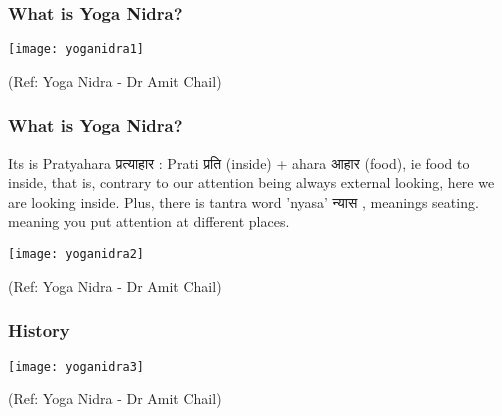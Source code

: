 \begin{frame}[fragile]\frametitle{What is Yoga Nidra?}
      \begin{center}
        \texttt{[image: yoganidra1]}

		{\tiny (Ref: Yoga Nidra - Dr Amit Chail)}		
        \end{center}

\end{frame}

\begin{frame}[fragile]\frametitle{What is Yoga Nidra?}
Its is Pratyahara प्रत्याहार  : Prati प्रति (inside) + ahara आहार  (food), ie food to inside, that is, contrary to our attention being always external looking, here we are looking inside. Plus, there is tantra word 'nyasa' न्यास , meanings seating. meaning you put attention at different places.

      \begin{center}
        \texttt{[image: yoganidra2]}

		{\tiny (Ref: Yoga Nidra - Dr Amit Chail)}		
        \end{center}

\end{frame}

\begin{frame}[fragile]\frametitle{History}
      \begin{center}
        \texttt{[image: yoganidra3]}

		{\tiny (Ref: Yoga Nidra - Dr Amit Chail)}		
        \end{center}

\end{frame}

